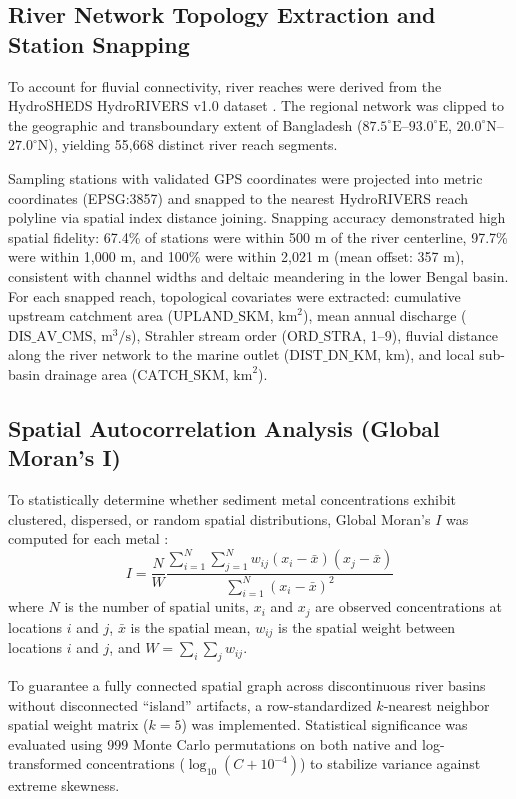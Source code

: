 \documentclass[authoryear,preprint,12pt]{elsarticle}
\begin{document}
\subsection{River Network Topology Extraction and Station Snapping}
To account for fluvial connectivity, river reaches were derived from the HydroSHEDS HydroRIVERS v1.0 dataset \citep{Lehner2013}. The regional network was clipped to the geographic and transboundary extent of Bangladesh ($87.5^\circ\text{E}$--$93.0^\circ\text{E}$, $20.0^\circ\text{N}$--$27.0^\circ\text{N}$), yielding 55,668 distinct river reach segments. 

Sampling stations with validated GPS coordinates were projected into metric coordinates (EPSG:3857) and snapped to the nearest HydroRIVERS reach polyline via spatial index distance joining. Snapping accuracy demonstrated high spatial fidelity: 67.4\% of stations were within 500 m of the river centerline, 97.7\% were within 1,000 m, and 100\% were within 2,021 m (mean offset: 357 m), consistent with channel widths and deltaic meandering in the lower Bengal basin. For each snapped reach, topological covariates were extracted: cumulative upstream catchment area ($\text{UPLAND\_SKM}$, $\text{km}^2$), mean annual discharge ($\text{DIS\_AV\_CMS}$, $\text{m}^3/\text{s}$), Strahler stream order ($\text{ORD\_STRA}$, 1--9), fluvial distance along the river network to the marine outlet ($\text{DIST\_DN\_KM}$, km), and local sub-basin drainage area ($\text{CATCH\_SKM}$, $\text{km}^2$).

\subsection{Spatial Autocorrelation Analysis (Global Moran's I)}
To statistically determine whether sediment metal concentrations exhibit clustered, dispersed, or random spatial distributions, Global Moran's $I$ was computed for each metal \citep{Moran1950}:
\begin{equation}
I = \frac{N}{W} \frac{\sum_{i=1}^N \sum_{j=1}^N w_{ij} (x_i - \bar{x})(x_j - \bar{x})}{\sum_{i=1}^N (x_i - \bar{x})^2}
\end{equation}
where $N$ is the number of spatial units, $x_i$ and $x_j$ are observed concentrations at locations $i$ and $j$, $\bar{x}$ is the spatial mean, $w_{ij}$ is the spatial weight between locations $i$ and $j$, and $W = \sum_i \sum_j w_{ij}$. 

To guarantee a fully connected spatial graph across discontinuous river basins without disconnected ``island'' artifacts, a row-standardized $k$-nearest neighbor spatial weight matrix ($k=5$) was implemented. Statistical significance was evaluated using 999 Monte Carlo permutations on both native and log-transformed concentrations ($\log_{10}(C + 10^{-4})$) to stabilize variance against extreme skewness.
\end{document}
